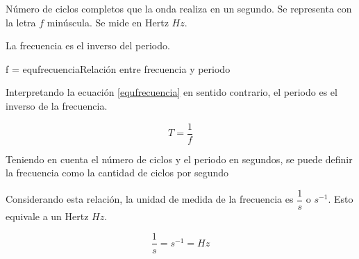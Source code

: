 Número de ciclos completos que la onda realiza en un segundo. Se representa con la letra $f$ minúscula. Se mide en Hertz $Hz$.


La frecuencia es el inverso del periodo.

\begin{listequbox}
  {f = }{equfrecuencia}{Relación entre frecuencia y periodo}
\end{listequbox}

Interpretando la ecuación \ref{equfrecuencia} en sentido contrario, el periodo es el inverso de la frecuencia.

\[
  T = \dfrac{1}{f}
\]

Teniendo en cuenta el número de ciclos y el periodo en segundos, se puede definir la frecuencia como la cantidad de ciclos por segundo

Considerando esta relación, la unidad de medida de la frecuencia es $\dfrac{1}{s}$ o $s^{-1}$. Esto equivale a un Hertz $Hz$.

\[
  \dfrac{1}{s}=s^{-1}=Hz
\]
